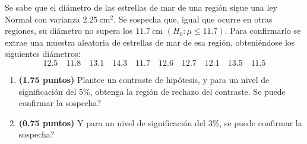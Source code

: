 
Se sabe que el diámetro de las estrellas de mar de una región sigue una ley Normal con varianza $2.25\ \text{cm}^2$. Se sospecha que, igual que ocurre en otras regiones, su diámetro no supera los $11.7\ \text{cm}$ $(H_0:\mu\leq 11.7)$. Para confirmarlo se extrae una muestra aleatoria de estrellas de mar de esa región, obteniéndose los siguientes diámetros:
\[
12.5\quad11.8\quad13.1\quad14.3\quad11.7\quad12.6\quad12.7\quad12.1\quad13.5\quad11.5
\]
\begin{enumerate}[label=\alph*)]
\item \textbf{(1.75 puntos)} Plantee un contraste de hipótesis, y para un nivel de significación del 5\%, obtenga la región de rechazo del contraste. \textquestiondown{}Se puede confirmar la sospecha?
\item \textbf{(0.75 puntos)} \textquestiondown{}Y para un nivel de significación del 3\%, se puede confirmar la sospecha?
\end{enumerate}
